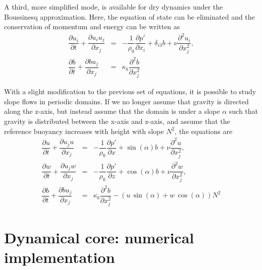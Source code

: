 \documentclass[gmd]{copernicus}
\begin{document}
A third, more simplified mode, is available for dry dynamics under the Boussinesq approximation. Here, the equation of state can be eliminated and the conservation of momentum and energy can be written as
\begin{eqnarray}
\dfrac{\partial u_i}{\partial t} + \dfrac{\partial u_i u_j}{\partial x_j} & = & 
- \dfrac{1}{\rho_0}\dfrac{\partial p'}{\partial x_i} + \delta_{i3} b + \nu \dfrac{\partial^2 u_i}{\partial x_j^2}\label{eq:consmombsimp},\\
\dfrac{\partial b}{\partial t} + \dfrac{\partial b u_j}{\partial x_j} & = & 
\kappa_b \dfrac{\partial^2 b}{\partial x_j^2}\label{eq:consenbsimp}
\end{eqnarray}

With a slight modification to the previous set of equations, it is possible to study slope flows in periodic domains. If we no longer assume that gravity is directed along the z-axis, but instead assume that the domain is under a slope $\alpha$ such that gravity is distributed between the x-axis and z-axis, and assume that the reference buoyancy increases with height with slope $N^2$, the equations are
\begin{eqnarray}
\dfrac{\partial u}{\partial t} + \dfrac{\partial u_j u}{\partial x_j} & = & 
- \dfrac{1}{\rho_0}\dfrac{\partial p'}{\partial x} + \sin(\alpha) b + \nu \dfrac{\partial^2 u}{\partial x_j^2}\label{eq:consuslope},\\
\dfrac{\partial w}{\partial t} + \dfrac{\partial u_j w}{\partial x_j} & = & 
- \dfrac{1}{\rho_0}\dfrac{\partial p'}{\partial z} + \cos(\alpha) b + \nu \dfrac{\partial^2 w}{\partial x_j^2}\label{eq:conswslope},\\
\dfrac{\partial b}{\partial t} + \dfrac{\partial b u_j}{\partial x_j} & = & 
\kappa_b \dfrac{\partial^2 b}{\partial x_j^2} - \left (u\,\sin(\alpha) + w\,\cos(\alpha) \right) N^2\label{eq:consbslope}
\end{eqnarray}

\section{Dynamical core: numerical implementation}\label{sec:dyncorediscrete}
\end{document}
